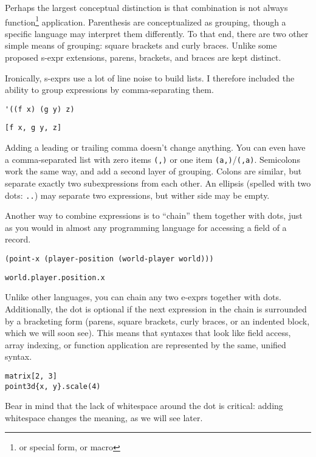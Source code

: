 \documentclass[11pt]{article} %
\begin{document}
Perhaps the largest conceptual distinction is that combination is not always function\footnote{or special form, or macro} application.
Parenthesis are conceptualized as grouping, though a specific language may interpret them differently.
To that end, there are two other simple means of grouping: square brackets and curly braces.
Unlike some proposed s-expr extensions, parens, brackets, and braces are kept distinct.

Ironically, s-exprs use a lot of line noise to build lists.
I therefore included the ability to group expressions by comma-separating them.
\begin{center}
\begin{verbatim}
'((f x) (g y) z)
\end{verbatim}
\begin{verbatim}
[f x, g y, z]
\end{verbatim}
\end{center}
Adding a leading or trailing comma doesn't change anything.
You can even have a comma-separated list with zero items \texttt{(,)} or one item \texttt{(a,)}/\texttt{(,a)}.
Semicolons work the same way, and add a second layer of grouping.
Colons are similar, but separate exactly two subexpressions from each other.
An ellipsis (spelled with two dots: \texttt{..}) may separate two expressions, but wither side may be empty.

Another way to combine expressions is to ``chain'' them together with dots, just as you would in almost any programming language for accessing a field of a record.
\begin{center}
\begin{verbatim}
(point-x (player-position (world-player world)))
\end{verbatim}
\begin{verbatim}
world.player.position.x
\end{verbatim}
\end{center}
Unlike other languages, you can chain any two e-exprs together with dots.
Additionally, the dot is optional if the next expression in the chain is surrounded by a bracketing form (parens, square brackets, curly braces, or an indented block, which we will soon see).
This means that syntaxes that look like field access, array indexing, or function application are represented by the same, unified syntax.
\begin{center}
\begin{verbatim}
matrix[2, 3]
point3d{x, y}.scale(4)
\end{verbatim}
\end{center}
Bear in mind that the lack of whitespace around the dot is critical: adding whitespace changes the meaning, as we will see later.
\end{document}
